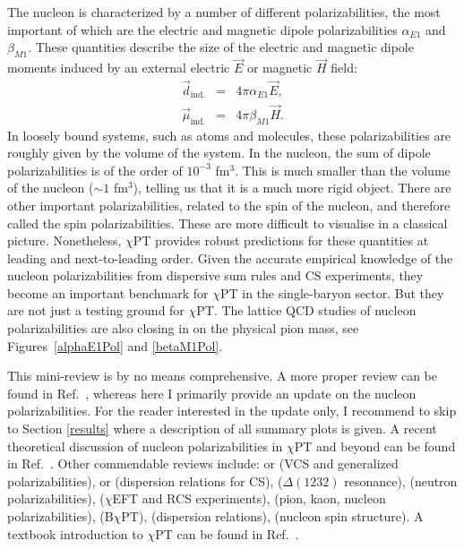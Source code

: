 \documentclass[preprints,review,accept,moreauthors,pdftex]{Definitions/mdpi}
\begin{document}
The nucleon is characterized by a number
of different polarizabilities, the most important of which 
are the electric and magnetic dipole polarizabilities $\alpha_{E1}$ and $\beta_{M1}$. These quantities describe the size of the electric and magnetic dipole moments induced by an external electric $\vec{E}$ or magnetic $\vec{H}$ field: 
\begin{subequations}
\begin{eqnarray}
\vec{d}_\mathrm{ind.} &=& 4\pi \alpha_{E1} \vec{E},\\
\vec{\mu}_\mathrm{ind.} &=& 4\pi \beta_{M1} \vec{H}.
\end{eqnarray}
\end{subequations}
In loosely bound systems, such as atoms and molecules, these
polarizabilities are roughly given by the volume of the system.
In the nucleon, the sum of dipole polarizabilities is of the order of $10^{-3}$ fm$^3$. This is much smaller than the volume of the nucleon ($\sim 1$ fm$^3$), telling us that it is a much more rigid object. 
There are other important polarizabilities, related to the spin of the nucleon, and therefore called the spin polarizabilities. These are more difficult to visualise in a classical picture.  
Nonetheless, $\chi$PT provides robust predictions for these quantities at leading and next-to-leading order. Given
the accurate empirical knowledge 
of the nucleon polarizabilities from dispersive sum rules and CS experiments,  they become an important benchmark for $\chi$PT in the single-baryon sector. But they are not just a testing ground for $\chi$PT. The lattice QCD studies of nucleon polarizabilities are also closing in on the physical pion mass, see Figures~\ref{alphaE1Pol} and \ref{betaM1Pol}.


This mini-review is by no means comprehensive. A more proper review can be found in  Ref.~\cite{Hagelstein:2015egb}, whereas here I primarily provide an update on the nucleon polarizabilities. For the reader interested in the update only, I recommend to skip to Section \ref{results} where a description of all summary plots is given. A recent theoretical discussion of nucleon polarizabilities in $\chi$PT and beyond can be found in Ref.~\cite{Lensky:2019pye}. Other commendable reviews include: \citet{Guichon:1998xv} or \citet{Fonvieille:2019eyf} (VCS and generalized polarizabilities), \citet{Drechsel:2002ar} or \citet{Pasquini:2018wbl} (dispersion relations for CS), \citet{Pascalutsa:2006up} ($\Delta(1232)$ resonance), \citet{Phillips:2009af} (neutron polarizabilities), \citet{Griesshammer:2012we} ($\chi$EFT and RCS experiments), \citet{Holstein:2013kia} (pion, kaon, nucleon polarizabilities), \citet{Geng:2013xn} (B$\chi$PT), \citet{Pascalutsa:2018ced} (dispersion relations), \citet{Deur:2018roz} (nucleon spin structure). A textbook introduction to $\chi$PT can be found in Ref.~\cite{Scherer2012}.
\end{document}
